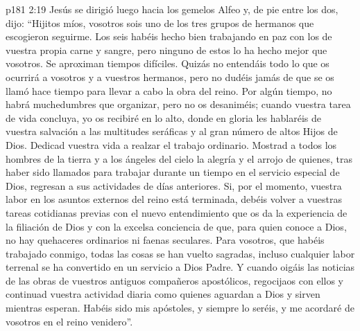 \vs p181 2:19 \pc Jesús se dirigió luego hacia los gemelos Alfeo y, de pie entre los dos, dijo: “Hijitos míos, vosotros sois uno de los tres grupos de hermanos que escogieron seguirme. Los seis habéis hecho bien trabajando en paz con los de vuestra propia carne y sangre, pero ninguno de estos lo ha hecho mejor que vosotros. Se aproximan tiempos difíciles. Quizás no entendáis todo lo que os ocurrirá a vosotros y a vuestros hermanos, pero no dudéis jamás de que se os llamó hace tiempo para llevar a cabo la obra del reino. Por algún tiempo, no habrá muchedumbres que organizar, pero no os desaniméis; cuando vuestra tarea de vida concluya, yo os recibiré en lo alto, donde en gloria les hablaréis de vuestra salvación a las multitudes seráficas y al gran número de altos Hijos de Dios. Dedicad vuestra vida a realzar el trabajo ordinario. Mostrad a todos los hombres de la tierra y a los ángeles del cielo la alegría y el arrojo de quienes, tras haber sido llamados para trabajar durante un tiempo en el servicio especial de Dios, regresan a sus actividades de días anteriores. Si, por el momento, vuestra labor en los asuntos externos del reino está terminada, debéis volver a vuestras tareas cotidianas previas con el nuevo entendimiento que os da la experiencia de la filiación de Dios y con la excelsa conciencia de que, para quien conoce a Dios, no hay quehaceres ordinarios ni faenas seculares. Para vosotros, que habéis trabajado conmigo, todas las cosas se han vuelto sagradas, incluso cualquier labor terrenal se ha convertido en un servicio a Dios Padre. Y cuando oigáis las noticias de las obras de vuestros antiguos compañeros apostólicos, regocijaos con ellos y continuad vuestra actividad diaria como quienes aguardan a Dios y sirven mientras esperan. Habéis sido mis apóstoles, y siempre lo seréis, y me acordaré de vosotros en el reino venidero”.
